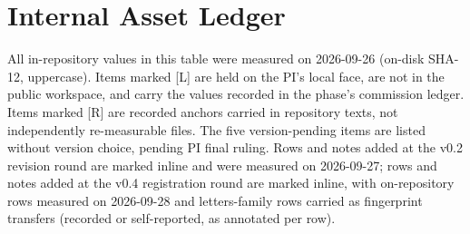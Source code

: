 \documentclass[11pt]{article}
\begin{document}
\section{Internal Asset Ledger}
\noindent All in-repository values in this table were measured on 2026-09-26 (on-disk SHA-12, uppercase). Items marked [L] are held on the PI's local face, are not in the public workspace, and carry the values recorded in the phase's commission ledger. Items marked [R] are recorded anchors carried in repository texts, not independently re-measurable files. The five version-pending items are listed without version choice, pending PI final ruling. Rows and notes added at the v0.2 revision round are marked inline and were measured on 2026-09-27; rows and notes added at the v0.4 registration round are marked inline, with on-repository rows measured on 2026-09-28 and letters-family rows carried as fingerprint transfers (recorded or self-reported, as annotated per row).\par
\end{document}
